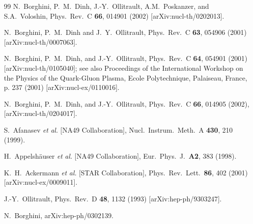 \documentclass[aps,prc,superscriptaddress,showpacs,floatfix,nofootinbib]{revtex4}
\begin{document}
\begin{thebibliography}{99}
N.~Borghini, P.~M.~Dinh, J.-Y.~Ollitrault, A.M.~Poskanzer, and S.A.~Voloshin,
Phys.\ Rev.\ C {\bf 66}, 014901 (2002)
[arXiv:nucl-th/0202013].

N.~Borghini, P.~M.~Dinh and J.~Y.~Ollitrault,
Phys.\ Rev.\ C {\bf 63}, 054906 (2001)
[arXiv:nucl-th/0007063].

N.~Borghini, P.~M.~Dinh, and J.-Y.~Ollitrault,
Phys.\ Rev.\ C {\bf 64}, 054901 (2001)
[arXiv:nucl-th/0105040];
see also Proceedings of the International Workshop on the Physics of the
Quark-Gluon Plasma, Ecole Polytechnique, Palaiseau, France, p. 237 (2001)
[arXiv:nucl-ex/0110016].

N.~Borghini, P.~M.~Dinh, and J.-Y.~Ollitrault,
Phys.\ Rev.\ C {\bf 66}, 014905 (2002),
[arXiv:nucl-th/0204017].

S.~Afanasev {\it et al.}  [NA49 Collaboration],
Nucl.\ Instrum.\ Meth.\ A {\bf 430}, 210 (1999).

H.~Appelsh{\"a}user {\it et al.}  [NA49 Collaboration],
Eur.\ Phys.\ J.\ {\bf A2}, 383 (1998).

K.~H.~Ackermann {\it et al.}  [STAR Collaboration],
Phys.\ Rev.\ Lett.\  {\bf 86}, 402 (2001)
[arXiv:nucl-ex/0009011].

J.-Y.~Ollitrault,
Phys.\ Rev.\ D {\bf 48}, 1132 (1993)
[arXiv:hep-ph/9303247].

N.~Borghini,
arXiv:hep-ph/0302139.


\end{thebibliography}
\end{document}
